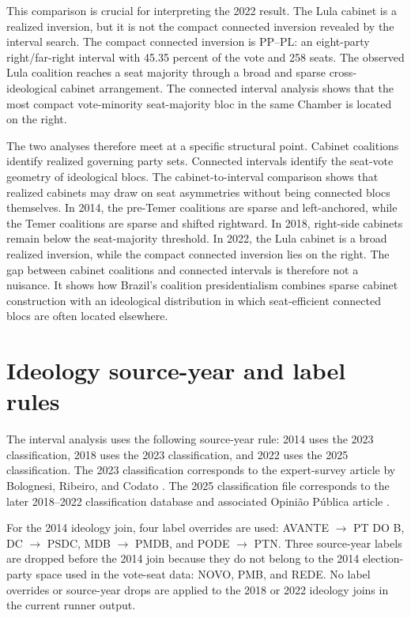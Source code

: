 \documentclass[11pt]{article}
\newcommand{\RepoRoot}{/home/marcelo/Sync/Projects/electoral-inversion}%
\newcommand{\RepoRoot}{/home/marcelovmaciel/Sync/Projects/electoral_inversions}%
\newcommand{\ArtifactRoot}{\RepoRoot/processing/Processing/output/paper}
\begin{document}
This comparison is crucial for interpreting the 2022 result. The Lula cabinet is
a realized inversion, but it is not the compact connected inversion revealed by
the interval search. The compact connected inversion is PP--PL: an eight-party
right/far-right interval with 45.35 percent of the vote and 258 seats. The
observed Lula coalition reaches a seat majority through a broad and sparse
cross-ideological cabinet arrangement. The connected interval analysis shows
that the most compact vote-minority seat-majority bloc in the same Chamber is
located on the right.

The two analyses therefore meet at a specific structural point. Cabinet
coalitions identify realized governing party sets. Connected intervals identify
the seat-vote geometry of ideological blocs. The cabinet-to-interval comparison
shows that realized cabinets may draw on seat asymmetries without being
connected blocs themselves. In 2014, the pre-Temer coalitions are sparse and
left-anchored, while the Temer coalitions are sparse and shifted rightward. In
2018, right-side cabinets remain below the seat-majority threshold. In 2022, the
Lula cabinet is a broad realized inversion, while the compact connected
inversion lies on the right. The gap between cabinet coalitions and connected
intervals is therefore not a nuisance. It shows how Brazil's coalition
presidentialism combines sparse cabinet construction with an ideological
distribution in which seat-efficient connected blocs are often located elsewhere.



\section{Ideology source-year and label rules}\label{app:ideology-rules}

The interval analysis uses the following source-year rule: 2014 uses the 2023
classification, 2018 uses the 2023 classification, and 2022 uses the 2025
classification. The 2023 classification corresponds to the expert-survey article
by Bolognesi, Ribeiro, and Codato \parencite{bolognesi2023nova}. The 2025
classification file corresponds to the later 2018--2022 classification database
and associated Opinião Pública article \parencite{bolognesi2025dataverse,bolognesi2026desaparecimento}.

For the 2014 ideology join, four label overrides are used: AVANTE $\rightarrow$
PT DO B, DC $\rightarrow$ PSDC, MDB $\rightarrow$ PMDB, and PODE $\rightarrow$
PTN. Three source-year labels are dropped before the 2014 join because they do
not belong to the 2014 election-party space used in the vote-seat data: NOVO,
PMB, and REDE. No label overrides or source-year drops are applied to the 2018
or 2022 ideology joins in the current runner output.
\end{document}
